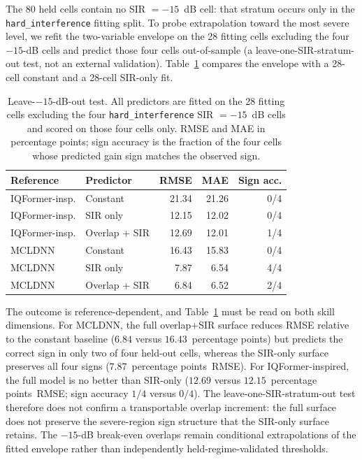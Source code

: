 \documentclass[letterpaper,onecolumn,11pt,journal]{IEEEtran}
\newcommand{\pp}{percentage points}
\begin{document}
The 80 held cells contain no SIR $=-15$~dB cell: that stratum occurs only in
the \texttt{hard\_interference} fitting split. To probe extrapolation toward
the most severe level, we refit the two-variable envelope on the 28 fitting
cells excluding the four $-15$-dB cells and predict those four cells
out-of-sample (a leave-one-SIR-stratum-out test, not an external validation).
Table~\ref{tab:leave15} compares the envelope with a 28-cell constant and a
28-cell SIR-only fit.

\begin{table}[t]
\centering
\caption{Leave-$-15$-dB-out test. All predictors are fitted on the 28
fitting cells excluding the four \texttt{hard\_interference} SIR $=-15$~dB
cells and scored on those four cells only. RMSE and MAE in \pp; sign
accuracy is the fraction of the four cells whose predicted gain sign matches
the observed sign.}
\label{tab:leave15}
\footnotesize
\setlength{\tabcolsep}{4pt}
\begin{tabular}{llrrr}
\toprule
Reference & Predictor & RMSE & MAE & Sign acc.\\
\midrule
IQFormer-insp. & Constant & 21.34 & 21.26 & 0/4\\
IQFormer-insp. & SIR only & 12.15 & 12.02 & 0/4\\
IQFormer-insp. & Overlap + SIR & 12.69 & 12.01 & 1/4\\
\midrule
MCLDNN & Constant & 16.43 & 15.83 & 0/4\\
MCLDNN & SIR only & 7.87 & 6.54 & 4/4\\
MCLDNN & Overlap + SIR & 6.84 & 6.52 & 2/4\\
\bottomrule
\end{tabular}
\end{table}

The outcome is reference-dependent, and Table~\ref{tab:leave15} must be read
on both skill dimensions. For MCLDNN, the full overlap+SIR surface reduces
RMSE relative to the constant baseline ($6.84$ versus $16.43$~\pp) but
predicts the correct sign in only two of four held-out cells, whereas the
SIR-only surface preserves all four signs ($7.87$~\pp\ RMSE). For
IQFormer-inspired, the full model is no better than SIR-only ($12.69$ versus
$12.15$~\pp\ RMSE; sign accuracy $1/4$ versus $0/4$). The
leave-one-SIR-stratum-out test therefore does not confirm a transportable
overlap increment: the full surface does not preserve the severe-region sign
structure that the SIR-only surface retains. The $-15$-dB break-even overlaps
remain conditional extrapolations of the fitted envelope rather than
independently held-regime-validated thresholds.
\end{document}
